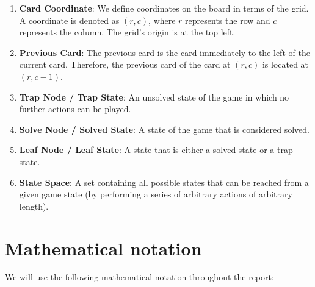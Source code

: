 \begin{enumerate}
    \item \textbf{Card Coordinate}: We define coordinates on the board in terms of the grid. A coordinate is denoted as $(r, c)$, where $r$ represents the row and $c$ represents the column. The grid's origin is at the top left. 
    \item \textbf{Previous Card}: The previous card is the card immediately to the left of the current card. Therefore, the previous card of the card at $(r, c)$ is located at $(r, c-1)$.
    \item \textbf{Trap Node / Trap State}: An unsolved state of the game in which no further actions can be played.
    \item \textbf{Solve Node / Solved State}: A state of the game that is considered solved.
    \item \textbf{Leaf Node / Leaf State}: A state that is either a solved state or a trap state.
    \item \textbf{State Space}: A set containing all possible states that can be reached from a given game state (by performing a series of arbitrary actions of arbitrary length).
\end{enumerate}

\section{Mathematical notation}
We will use the following mathematical notation throughout the report:

